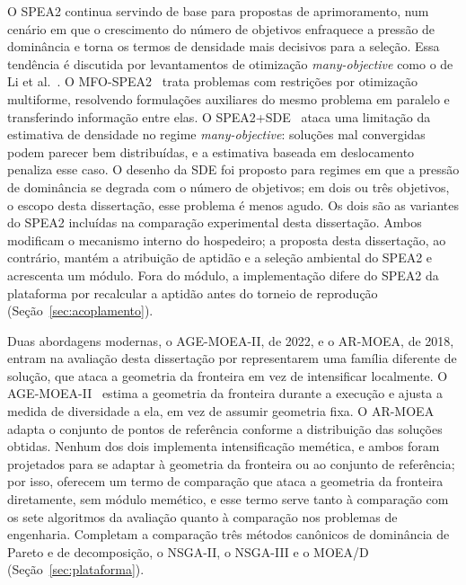 O SPEA2 continua servindo de base para propostas de aprimoramento, num cenário em que o crescimento do número de objetivos enfraquece a pressão de dominância e torna os termos de densidade mais decisivos para a seleção. Essa tendência é discutida por levantamentos de otimização \textit{many-objective} como o de Li et al.~\cite{li2015many}. O MFO-SPEA2~\cite{jiao2023multiform} trata problemas com restrições por otimização multiforme, resolvendo formulações auxiliares do mesmo problema em paralelo e transferindo informação entre elas. O SPEA2+SDE~\cite{li2014shift} ataca uma limitação da estimativa de densidade no regime \textit{many-objective}: soluções mal convergidas podem parecer bem distribuídas, e a estimativa baseada em deslocamento penaliza esse caso. O desenho da SDE foi proposto para regimes em que a pressão de dominância se degrada com o número de objetivos; em dois ou três objetivos, o escopo desta dissertação, esse problema é menos agudo. Os dois são as variantes do SPEA2 incluídas na comparação experimental desta dissertação. Ambos modificam o mecanismo interno do hospedeiro; a proposta desta dissertação, ao contrário, mantém a atribuição de aptidão e a seleção ambiental do SPEA2 e acrescenta um módulo. Fora do módulo, a implementação difere do SPEA2 da plataforma por recalcular a aptidão antes do torneio de reprodução (Seção~\ref{sec:acoplamento}).

Duas abordagens modernas, o AGE-MOEA-II, de 2022, e o AR-MOEA, de 2018, entram na avaliação desta dissertação por representarem uma família diferente de solução, que ataca a geometria da fronteira em vez de intensificar localmente. O AGE-MOEA-II~\cite{panichella2022agemoeaii} estima a geometria da fronteira durante a execução e ajusta a medida de diversidade a ela, em vez de assumir geometria fixa. O AR-MOEA~\cite{tian2018armoea} adapta o conjunto de pontos de referência conforme a distribuição das soluções obtidas. Nenhum dos dois implementa intensificação memética, e ambos foram projetados para se adaptar à geometria da fronteira ou ao conjunto de referência; por isso, oferecem um termo de comparação que ataca a geometria da fronteira diretamente, sem módulo memético, e esse termo serve tanto à comparação com os sete algoritmos da avaliação quanto à comparação nos problemas de engenharia. Completam a comparação três métodos canônicos de dominância de Pareto e de decomposição, o NSGA-II, o NSGA-III e o MOEA/D (Seção~\ref{sec:plataforma}).

